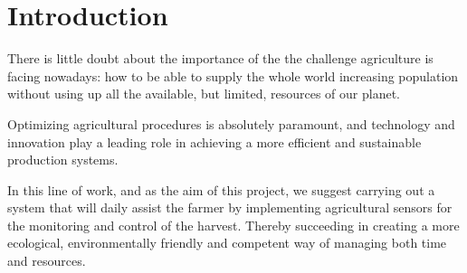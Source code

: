 \chapter{Introduction}\label{cap:introduccion}
There is little doubt about the importance of the the challenge agriculture is facing nowadays: how to be able to supply the whole world increasing population without using up all the available, but limited, resources of our planet. 

Optimizing agricultural procedures is absolutely paramount, and technology and innovation play a leading role in achieving a more efficient and sustainable production systems.

In this line of work, and as the aim of this project, we suggest carrying out a system that will daily assist the farmer by implementing agricultural sensors for the monitoring and control of the harvest. Thereby succeeding in creating a more ecological, environmentally friendly and competent way of managing both time and resources.


